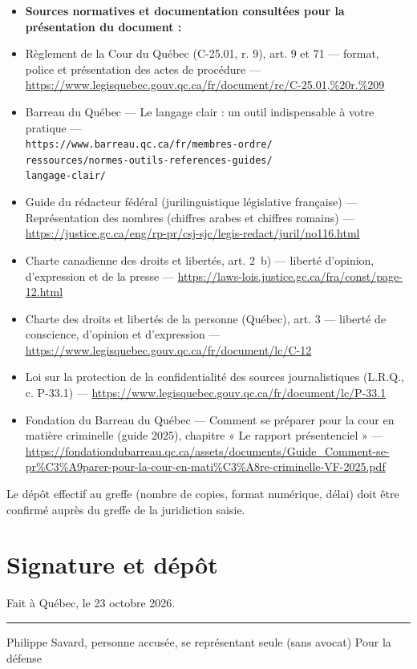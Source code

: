 \documentclass[12pt,letterpaper,oneside]{article}
\begin{document}
\begin{itemize}[leftmargin=*]
\item[] \textbf{Sources normatives et documentation consultées pour la présentation du document :}
\item Règlement de la Cour du Québec (C-25.01, r. 9), art. 9 et 71 — format, police et présentation des actes de procédure — \url{https://www.legisquebec.gouv.qc.ca/fr/document/rc/C-25.01,%20r.%209}
\item Barreau du Québec — Le langage clair : un outil indispensable à votre pratique —\\
\texttt{https://www.barreau.qc.ca/fr/membres-ordre/}\\
\texttt{ressources/normes-outils-references-guides/}\\
\texttt{langage-clair/}
\item Guide du rédacteur fédéral (jurilinguistique législative française) — Représentation des nombres (chiffres arabes et chiffres romains) — \url{https://justice.gc.ca/eng/rp-pr/csj-sjc/legis-redact/juril/no116.html}
\item Charte canadienne des droits et libertés, art. 2~b) — liberté d'opinion, d'expression et de la presse — \url{https://laws-lois.justice.gc.ca/fra/const/page-12.html}
\item Charte des droits et libertés de la personne (Québec), art. 3 — liberté de conscience, d'opinion et d'expression — \url{https://www.legisquebec.gouv.qc.ca/fr/document/lc/C-12}
\item Loi sur la protection de la confidentialité des sources journalistiques (L.R.Q., c. P-33.1) — \url{https://www.legisquebec.gouv.qc.ca/fr/document/lc/P-33.1}
\item Fondation du Barreau du Québec — Comment se préparer pour la cour en matière criminelle (guide 2025), chapitre « Le rapport présentenciel » — \url{https://fondationdubarreau.qc.ca/assets/documents/Guide_Comment-se-pr%C3%A9parer-pour-la-cour-en-mati%C3%A8re-criminelle-VF-2025.pdf}
\end{itemize}

Le dépôt effectif au greffe (nombre de copies, format numérique, délai) doit être confirmé auprès du greffe de la juridiction saisie.

\section{Signature et dépôt}
\vspace{1cm}
\begin{flushright}
Fait à Québec, le 23 octobre 2026.

\vspace{1.2cm}
\rule{6cm}{0.4pt}
Philippe Savard, personne accusée, se représentant seule (sans avocat)
Pour la défense
\end{flushright}
\end{document}
